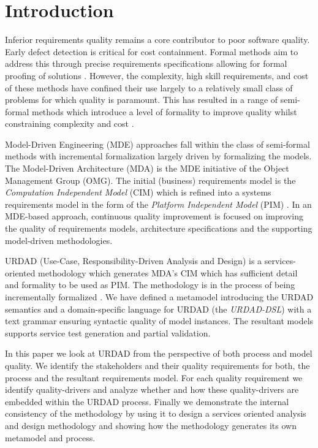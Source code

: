 \section{Introduction}
\label{sec:Introduction}

Inferior requirements quality remains a core contributor to poor software quality\cite{heck_experiences_2008}. Early defect detection is critical for cost containment\cite{biffl_software_2000}. Formal methods aim to address this through precise requirements specifications allowing for formal proofing of solutions \cite{hinchey_software_2008}. However, the complexity, high skill requirements, and cost of these methods have confined their use largely to a relatively small class of problems for which quality is paramount. This has resulted in a range of semi-formal methods which introduce a level of formality to improve quality whilst constraining complexity and cost \cite{razali_usability_2008}.

Model-Driven Engineering (MDE) \cite{frankel_model_2003} approaches fall within the class of semi-formal methods with incremental formalization largely driven by formalizing the models. The Model-Driven Architecture (MDA) is the MDE initiative of the Object Management Group (OMG). The initial (business) requirements model is the \emph{Computation Independent Model} (CIM) which is refined into a systems requirements model in the form of the \emph{Platform Independent Model} (PIM) \cite{_mda_2003}. In an MDE-based approach, continuous quality improvement is focused on improving the quality of requirements models, architecture specifications and the supporting model-driven methodologies.

URDAD (Use-Case, Responsibility-Driven Analysis and Design) \cite{solms_technology_2007} is a services-oriented methodology which generates MDA's CIM \cite{solms_generating_2009} which has sufficient detail and formality to be used as PIM. The methodology is in the process of being incrementally formalized \cite{solms_urdad_2010}. We have defined a metamodel introducing the URDAD semantics and a domain-specific language for URDAD (the \emph{URDAD-DSL}) with a text grammar ensuring syntactic quality of model instances. The resultant models supports service test generation and partial validation.

In this paper we look at URDAD from the perspective of both process and model quality. We identify the stakeholders and their quality requirements for both, the process and the resultant requirements model. For each quality requirement we identify quality-drivers and analyze whether and how these quality-drivers are embedded within the URDAD process. Finally we demonstrate the internal consistency of the methodology by using it to design a services oriented analysis and design methodology and showing how the methodology generates its own metamodel and process.
